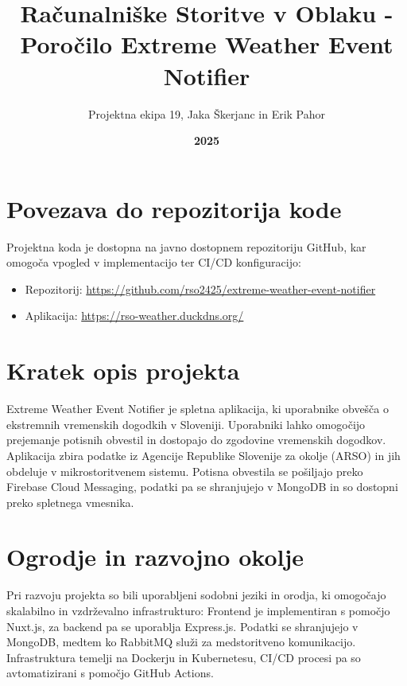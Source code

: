 \documentclass[a4paper,11pt]{article}
\title{\textbf{Računalniške Storitve v Oblaku - Poročilo} \newline Extreme Weather Event Notifier}
\author{Projektna ekipa 19, Jaka Škerjanc in Erik Pahor}
\date{\textbf{2025}}
\begin{document}
\maketitle

\newpage

\section*{Povezava do repozitorija kode}
Projektna koda je dostopna na javno dostopnem repozitoriju GitHub, kar omogo\v{c}a vpogled v implementacijo ter CI/CD konfiguracijo:
\begin{itemize}
	\item Repozitorij: \url{https://github.com/rso2425/extreme-weather-event-notifier}
	\item Aplikacija: \url{https://rso-weather.duckdns.org/}
\end{itemize}

\section*{Kratek opis projekta}
Extreme Weather Event Notifier je spletna aplikacija, ki uporabnike obve\v{s}\v{c}a o ekstremnih vremenskih dogodkih v Sloveniji. Uporabniki lahko omogo\v{c}ijo prejemanje potisnih obvestil in dostopajo do zgodovine vremenskih dogodkov. Aplikacija zbira podatke iz Agencije Republike Slovenije za okolje (ARSO) in jih obdeluje v mikrostoritvenem sistemu. Potisna obvestila se po\v{s}iljajo preko Firebase Cloud Messaging, podatki pa se shranjujejo v MongoDB in so dostopni preko spletnega vmesnika.

\section*{Ogrodje in razvojno okolje}
Pri razvoju projekta so bili uporabljeni sodobni jeziki in orodja, ki omogo\v{c}ajo skalabilno in vzdr\v{z}evalno infrastrukturo:
Frontend je implementiran s pomo\v{c}jo Nuxt.js, za backend pa se uporablja Express.js. Podatki se shranjujejo v MongoDB, medtem ko RabbitMQ slu\v{z}i za medstoritveno komunikacijo. Infrastruktura temelji na Dockerju in Kubernetesu, CI/CD procesi pa so avtomatizirani s pomo\v{c}jo GitHub Actions.
\newpage
\end{document}
